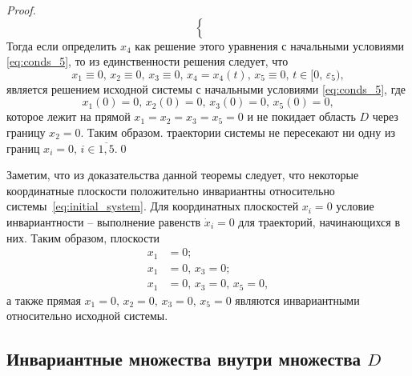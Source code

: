 \documentclass[14pt,a4paper]{extarticle}
\begin{document}
\begin{proof}
\begin{equation*}
\begin{cases}
\begin{aligned}
				\end{aligned}
			\end{cases}
		\end{equation*} 
		Тогда если определить $x_4$ как решение этого уравнения с начальными условиями \ref{eq:conds_5}, то из единственности решения следует, что
		\[x_1\equiv0,\, x_2\equiv0,\, x_3\equiv0,\, x_4=x_4(t),\, x_5\equiv0,\, t\in[0,\,\varepsilon_5),\]
		является решением исходной системы с начальными условиями \ref{eq:conds_5}, где
		\[x_1(0)=0,\, x_2(0)=0,\, x_3(0)=0,\, x_5(0)=0,\]
		которое лежит на прямой $x_1=x_2=x_3=x_5=0$ и не покидает область $D$ через границу $x_2=0$. Таким образом. траектории системы не пересекают ни одну из границ $x_i=0,\, i\in\overline{1,5}$.\qed
	\end{proof}
	
	Заметим, что из доказательства данной теоремы следует, что некоторые координатные плоскости положительно инвариантны относительно системы~\ref{eq:initial_system}. Для координатных плоскостей $x_i=0$ условие инвариантности -- выполнение равенств $\dot{x}_i=0$ для траекторий, начинающихся в них. Таким образом, плоскости  
	\begin{align*}
		x_1&=0;\\
		x_1&=0,\, x_3=0;\\
		x_1&=0,\, x_3=0,\, x_5=0,
	\end{align*}
	а также прямая $x_1=0,\, x_2=0,\, x_3=0,\, x_5=0$ являются инвариантными относительно исходной системы.  
	
	\subsection{Инвариантные множества внутри множества $D$}
	
\end{document}
